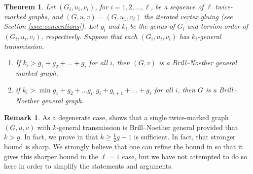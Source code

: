 \documentclass[11pt]{article}
\newtheorem{theorem}[theo]{Theorem}
\theoremstyle{definition}
\newtheorem{rema}[theo]{Remark}
\numberwithin{equation}{section}
\begin{document}
\begin{theorem}
\label{thm:bngChain}
Let $(G_i, u_i, v_i)$, for $i=1,2, \ldots, \ell$, be a sequence of $\ell$ twice-marked graphs, and $(G,u,v) = (G,u_1, v_\ell)$ the iterated vertex gluing (see Section \ref{ssec:conventions}). Let $g_i$ and $k_i$ be the genus of $G_i$ and torsion order of $(G_i,u_i,v_i)$, respectively.  Suppose that each $(G_i, u_i,v_i)$ has $k_i$-general transmission.
\begin{enumerate}[label = \arabic*)]
    \item If $k_i > g_1 + g_2 + \ldots + g_i$ for all $i$, then $(G,v)$ is a Brill--Noether general marked graph.
    \item if $k_i > \min{g_1 + g_2 + \ldots g_i, g_i + g_{i+1} + \ldots + g_\ell }$ for all $i$, then $G$ is a Brill--Noether general graph.
\end{enumerate}
\end{theorem}

\begin{rema}
As a degenerate case,  shows that a single twice-marked graph $(G,u,v)$ with $k$-general transmission is Brill--Noether general provided that $k > g$. In fact, we prove in  that $k \geq \frac12 g + 1$ is sufficient. In fact, that stronger bound is sharp. We strongly believe that one can refine the bound in  so that it gives this sharper bound in the $\ell = 1$ case, but we have not attempted to do so here in order to simplify the statements and arguments.
\end{rema}
\end{document}

